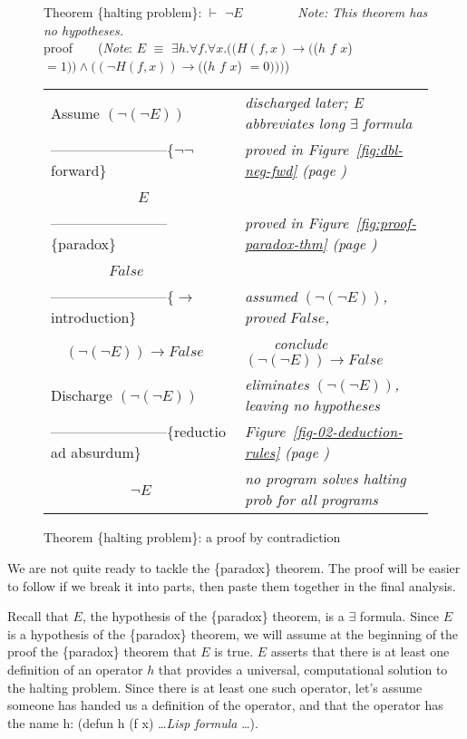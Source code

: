 \begin{figure}
Theorem \{halting problem\}: $\vdash$ $\neg E$ ~~~~~~~~\emph{Note: This theorem has no hypotheses.}\\
proof~~~~(\emph{Note}: $E$ $\equiv$ $\exists h. \forall f. \forall x.
((H(f, x) \rightarrow ($($h$ $f$ $x$) $ = 1)) \wedge ((\neg H(f, x)) \rightarrow ($($h$ $f$ $x$) $= 0)))$)
\begin{center}
\begin{tabular}{ll}
Assume $(\neg(\neg E))$                       &\emph{discharged later; E abbreviates long $\exists$ formula}\\
------------------------\{$\neg \neg$ forward\} &\emph{proved in Figure~\ref{fig:dbl-neg-fwd} (page \pageref{fig:dbl-neg-fwd})}\\
~~~~~~~~~~~~$E$                               &\\
------------------------\{paradox\}           &\emph{proved in Figure~\ref{fig:proof-paradox-thm} (page \pageref{fig:proof-paradox-thm})}\\
~~~~~~~~$False$                               &\\
------------------------\{$\rightarrow$ introduction\} &\emph{assumed} $(\neg(\neg E))$\emph{, proved} $False$\emph{,}\\
~~$(\neg(\neg E)) \rightarrow False$          &~~~~\emph{conclude} $(\neg(\neg E)) \rightarrow False$\\
Discharge $(\neg(\neg E))$                    &\emph{eliminates} $(\neg(\neg E))$\emph{, leaving no hypotheses}\\
------------------------\{reductio ad absurdum\}&\emph{Figure~\ref{fig-02-deduction-rules} (page \pageref{fig-02-deduction-rules})}\\
~~~~~~~~~~~$\neg E$                           &\emph{no program solves halting prob for all programs}\\
\end{tabular}
\end{center}
\caption{Theorem \{halting problem\}: a proof by contradiction}
\label{fig:halting-proof-strategy}
\end{figure}

We are not quite ready to tackle the \{paradox\} theorem.
The proof will be easier to follow if we break it into parts,
then paste them together in the final analysis.

Recall that $E$, the hypothesis of the \{paradox\} theorem,
is a $\exists$ formula.
Since $E$ is a hypothesis of the \{paradox\} theorem,
we will assume at the beginning of the proof
the \{paradox\} theorem that $E$ is true.
$E$ asserts that there is at least one definition of
an operator $h$ that provides a universal, computational solution
to the halting problem.
Since there is at least one such operator,
let's assume someone has handed us a
definition of the operator, and that the operator has the name h:
(defun h (f x)  \dots \emph{Lisp formula} \dots ).

